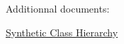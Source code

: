 Additionnal documents\+:
\begin{DoxyItemize}
\item \hyperlink{group__grpSynthHierarchy}{Synthetic Class Hierarchy} 
\end{DoxyItemize}